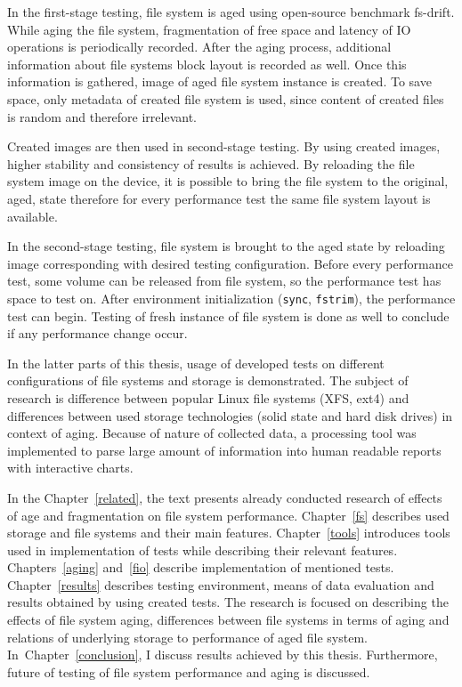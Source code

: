 \documentclass[
  color, %
  table, %
  lof,   %
  lot,   %
]{fithesis3}
\begin{document}
In the first-stage testing, file system is aged using open-source benchmark fs-drift. While aging the file system, fragmentation of free space and latency of IO operations is periodically recorded. After the aging process, additional information about file systems block layout is recorded as well. Once this information is gathered, image of aged file system instance is created. To save space, only metadata of created file system is used, since content of created files is random and therefore irrelevant.

Created images are then used in second-stage testing. By using created images, higher stability and consistency of results is achieved. By reloading the file system image on the device, it is possible to bring the file system to the original, aged, state therefore for every performance test the same file system layout is available.

In the second-stage testing, file system is brought to the aged state by reloading image corresponding with desired testing configuration. Before every performance test, some volume can be released from file system, so the performance test has space to test on. After environment initialization (\texttt{sync}, \texttt{fstrim}), the performance test can begin. Testing of fresh instance of file system is done as well to conclude if any performance change occur.

In the latter parts of this thesis, usage of developed tests on different configurations of file systems and storage is demonstrated. The subject of research is difference between popular Linux file systems (XFS, ext4) and differences between used storage technologies (solid state and hard disk drives) in context of aging. Because of nature of collected data, a processing tool was implemented to parse large amount of information into human readable reports with interactive charts.\footnotemark[1]


In the Chapter~\ref{related}, the text presents already conducted research of effects of age and fragmentation on file system performance. Chapter~\ref{fs} describes used storage and file systems and their main features. Chapter~\ref{tools} introduces tools used in implementation of tests while describing their relevant features. Chapters~\ref{aging} and~\ref{fio} describe implementation of mentioned tests. Chapter~\ref{results} describes testing environment, means of data evaluation and results obtained by using created tests. The research is focused on describing the effects of file system aging, differences between file systems in terms of aging and relations of underlying storage to performance of aged file system. In~Chapter~\ref{conclusion}, I discuss results achieved by this thesis. Furthermore, future of testing of file system performance and aging is discussed.
\end{document}
